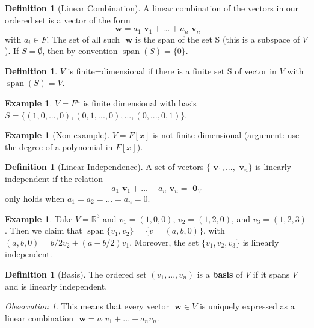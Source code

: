 \documentclass[12pt]{article}
\theoremstyle{definition}
\newtheorem{defn}[thm]{Definition}
\newtheorem{eg}[thm]{Example}
\theoremstyle{remark}
\newtheorem{obs}[thm]{Observation}
\numberwithin{equation}{section}
\newcommand\R{\mathbb R}    %
\newcommand\B[1]{\textbf{ #1}}
\DeclareMathOperator{\spn}{span}
\begin{document}
\begin{defn}[Linear Combination]
        A linear combination of the vectors in our ordered set is a vector of the form $$\B{w} = a_1\B{v}_1+...+a_n\B{v}_n$$ with $a_i \in F$. The set of all such $\B{w}$ is the span of the set S (this is a subspace of $V$). If $S = \emptyset$, then by convention $\spn(S) = \{0\}$.
\end{defn}

\vspace{15pt}

\begin{defn}
        $V$ is finite=dimensional if there is a finite set S of vector in $V$ with $\spn(S) = V$.
\end{defn}

\begin{eg}
        $V = F^n$ is finite dimensional with basis $S = \{(1,0,...,0),(0,1,...,0),..., (0,...,0,1)\}$.
\end{eg}
\begin{eg}[Non-example]
        $V = F[x]$ is not finite-dimensional (argument: use the degree of a polynomial in $F[x]$).
\end{eg}

\vspace{15pt}

\begin{defn}[Linear Independence]
        A set of vectors $\{\B{v}_1,...,\B{v}_n\}$ is linearly independent if the relation $$a_1\B{v}_1+...+a_n\B{v}_n = \B{0}_V$$ only holds when $a_1 = a_2 = ... = a_n = 0$.
\end{defn}

\begin{eg}
        Take $V = \R^3$ and $v_1 = (1,0,0)$, $v_2 = (1,2,0)$, and $v_3 = (1,2,3)$. Then we claim that $\spn\{v_1,v_2\} = \{v = (a,b,0)\}$, with $(a,b,0) = b/2v_2 + (a-b/2)v_1$. Moreover, the set $\{v_1,v_2,v_3\}$ is linearly independent.
\end{eg}

\vspace{15pt}

\begin{defn}[Basis]
        The ordered set $(v_1,...,v_n)$ is a \B{basis} of $V$ if it spans $V$ and is linearly independent.
\end{defn}
\begin{obs}
        This means that every vector $\B{w} \in V$ is uniquely expressed as a linear combination $\B{w} = a_1v_1 + ... + a_nv_n$.
\end{obs}
\end{document}
